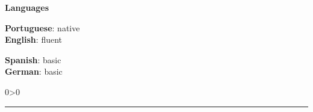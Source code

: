 \documentclass[a4paper,10pt]{article}
\newcommand{\createSection}[4][0]{
    \noindent
	\begin{minipage}{0.16\linewidth}
		\large{\textbf{#2}}
		\vspace{#3\baselineskip}
	\end{minipage}
	\hfill
	\begin{minipage}{0.79\linewidth}
		#4
		\ifnum0#1>0 { \hrule {\ } } \fi
	\end{minipage}
	\vspace{\baselineskip}
}
\begin{document}
	\createSection{Languages}{2}{
	    \large{
			\begin{minipage}{0.5\linewidth}
				\textbf{Portuguese}: native \\
				\textbf{English}: fluent \\
			\end{minipage}
			\begin{minipage}{0.5\linewidth}
				\textbf{Spanish}: basic \\
				\textbf{German}: basic \\
			\end{minipage}
		}
	}
    \label{lastPage}
\end{document}

